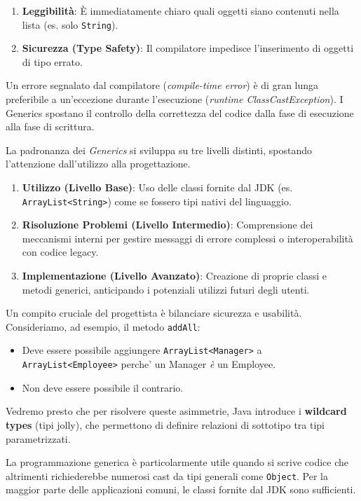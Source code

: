 \begin{enumerate}
    \item \textbf{Leggibilità}: È immediatamente chiaro quali oggetti siano contenuti nella lista (es. solo \texttt{String}).
    \item \textbf{Sicurezza (Type Safety)}: Il compilatore impedisce l'inserimento di oggetti di tipo errato.
\end{enumerate}

\begin{tip}[]
Un errore segnalato dal compilatore (\textit{compile-time error}) è di gran lunga preferibile a un'eccezione durante l'esecuzione (\textit{runtime ClassCastException}). I Generics spostano il controllo della correttezza del codice dalla fase di esecuzione alla fase di scrittura.
\end{tip}

La padronanza dei \textit{Generics} si sviluppa su tre livelli distinti, spostando l'attenzione dall'utilizzo alla progettazione.
\begin{enumerate}
    \item \textbf{Utilizzo (Livello Base)}: Uso delle classi fornite dal JDK (es. \texttt{ArrayList<String>}) come se fossero tipi nativi del linguaggio.
    \item \textbf{Risoluzione Problemi (Livello Intermedio)}: Comprensione dei meccanismi interni per gestire messaggi di errore complessi o interoperabilità con codice legacy.
    \item \textbf{Implementazione (Livello Avanzato)}: Creazione di proprie classi e metodi generici, anticipando i potenziali utilizzi futuri degli utenti.
\end{enumerate}
\medskip
Un compito cruciale del progettista è bilanciare sicurezza e usabilità. Consideriamo, ad esempio, il metodo \texttt{addAll}:
\begin{itemize}
    \item Deve essere possibile aggiungere \texttt{ArrayList<Manager>} a \texttt{ArrayList<Employee>} perche' un Manager \textit{è} un Employee.
    \item Non deve essere possibile il contrario.
\end{itemize}
\medskip
Vedremo presto che per risolvere queste asimmetrie, Java introduce i \textbf{wildcard types} (tipi jolly), che permettono di definire relazioni di sottotipo tra tipi parametrizzati.

\begin{tip}
La programmazione generica è particolarmente utile quando si scrive codice che altrimenti richiederebbe numerosi cast da tipi generali come \texttt{Object}. Per la maggior parte delle applicazioni comuni, le classi fornite dal JDK sono sufficienti.
\end{tip}

